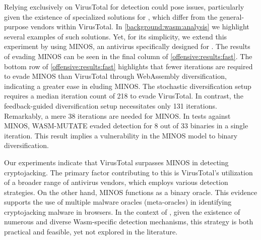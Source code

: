 \begin{strategy}
    \label{stochastic_div_minos}
    Relying exclusively on VirusTotal for detection could pose issues, particularly given the existence of specialized solutions for \Wasm, which differ from the general-purpose vendors within VirusTotal. 
    In \autoref{background:wasm:analysis} we highlight several examples of such solutions.
    Yet, for its simplicity, we extend this experiment by using MINOS\cite{MINOS}, an antivirus specifically designed for \Wasm. 
    The results of evading MINOS can be seen in the final column of \autoref{offensive:results:fast}.
    The bottom row of \autoref{offensive:results:fast} highlights that fewer iterations are required to evade MINOS than VirusTotal through WebAssembly diversification, indicating a greater ease in eluding MINOS.
    The stochastic diversification setup requires a median iteration count of 218 to evade VirusTotal. 
    In contrast, the feedback-guided diversification setup necessitates only 131 iterations. 
    Remarkably, a mere 38 iterations are needed for MINOS. 
    In tests against MINOS, WASM-MUTATE evaded detection for 8 out of 33 binaries in a single iteration. 
    This result implies a vulnerability in the MINOS model to binary diversification.
\end{strategy}

\begin{strategy}
    \label{meta-oracles}
    Our experiments indicate that VirusTotal surpasses MINOS in detecting \Wasm cryptojacking. 
    The primary factor contributing to this is VirusTotal's utilization of a broader range of antivirus vendors, which employs various detection strategies. 
    On the other hand, MINOS functions as a binary oracle. 
    This evidence supports the use of multiple malware oracles (meta-oracles) in identifying cryptojacking malware in browsers. 
    In the context of \Wasm, given the existence of numerous and diverse Wasm-specific detection mechanisms, this strategy is both practical and feasible, yet not explored in the literature.
\end{strategy}
    

